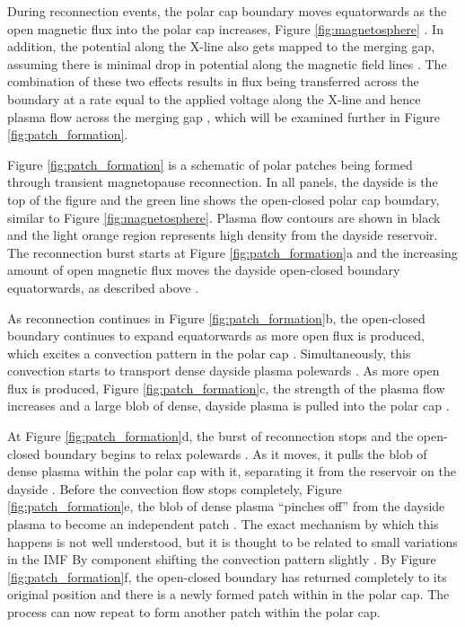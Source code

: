 During reconnection events, the polar cap boundary moves equatorwards as the open magnetic flux into the polar cap increases, Figure \ref{fig:magnetosphere} \citep{Cowley1991,Lockwood1992a}.  In addition, the potential along the X-line also gets mapped to the merging gap, assuming there is minimal drop in potential along the magnetic field lines \citep{Lockwood1992b}.  The combination of these two effects results in flux being transferred across the boundary at a rate equal to the applied voltage  along the X-line and hence plasma flow across the merging gap \citep{Lockwood1992b}, which will be examined further in Figure \ref{fig:patch_formation}.  

Figure \ref{fig:patch_formation} is a schematic of polar patches being formed through transient magnetopause reconnection.  In all panels, the dayside is the top of the figure and the green line shows the open-closed polar cap boundary, similar to Figure \ref{fig:magnetosphere}.  Plasma flow contours are shown in black and the light orange region represents high density from the dayside reservoir.  The reconnection burst starts at Figure \ref{fig:patch_formation}a and the increasing amount of open magnetic flux moves the dayside open-closed boundary equatorwards, as described above \citep{Cowley1991}.

As reconnection continues in Figure \ref{fig:patch_formation}b, the open-closed boundary continues to expand equatorwards as more open flux is produced, which excites a convection pattern in the polar cap \citep{Cowley1991}.  Simultaneously, this convection starts to transport dense dayside plasma polewards \citep{Lockwood1992b}.  As more open flux is produced, Figure \ref{fig:patch_formation}c, the strength of the plasma flow increases and a large blob of dense, dayside plasma is pulled into the polar cap \citep{Lockwood1992b}.

At Figure \ref{fig:patch_formation}d, the burst of reconnection stops and the open-closed boundary begins to relax polewards \citep{Cowley1991}.  As it moves, it pulls the blob of dense plasma within the polar cap with it, separating it from the reservoir on the dayside \citep{Lockwood1992b}.  Before the convection flow stops completely, Figure \ref{fig:patch_formation}e, the blob of dense plasma ``pinches off'' from the dayside plasma to become an independent patch \citep{Lockwood1992b}.  The exact mechanism by which this happens is not well understood, but it is thought to be related to small variations in the IMF By component shifting the convection pattern slightly \citep{Cowley1980,Lockwood1992b}.  By Figure \ref{fig:patch_formation}f, the open-closed boundary has returned completely to its original position and there is a newly formed patch within in the polar cap.  The process can now repeat to form another patch within the polar cap.

